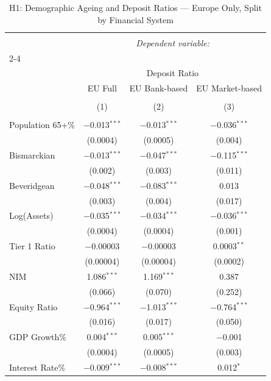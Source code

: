 
\begin{table}[!htbp] \centering 
  \caption{H1: Demographic Ageing and Deposit Ratios --- Europe Only, Split by Financial System} 
  \label{} 
\begin{tabular}{@{\extracolsep{5pt}}lccc} 
\\[-1.8ex]\hline 
\hline \\[-1.8ex] 
 & \multicolumn{3}{c}{\textit{Dependent variable:}} \\ 
\cline{2-4} 
\\[-1.8ex] & \multicolumn{3}{c}{Deposit Ratio} \\ 
 & EU Full & EU Bank-based & EU Market-based \\ 
\\[-1.8ex] & (1) & (2) & (3)\\ 
\hline \\[-1.8ex] 
 Population 65+\% & $-$0.013$^{***}$ & $-$0.013$^{***}$ & $-$0.036$^{***}$ \\ 
  & (0.0004) & (0.0005) & (0.004) \\ 
  Bismarckian & $-$0.013$^{***}$ & $-$0.047$^{***}$ & $-$0.115$^{***}$ \\ 
  & (0.002) & (0.003) & (0.011) \\ 
  Beveridgean & $-$0.048$^{***}$ & $-$0.083$^{***}$ & 0.013 \\ 
  & (0.003) & (0.004) & (0.017) \\ 
  Log(Assets) & $-$0.035$^{***}$ & $-$0.034$^{***}$ & $-$0.036$^{***}$ \\ 
  & (0.0004) & (0.0004) & (0.001) \\ 
  Tier 1 Ratio & $-$0.00003 & $-$0.00003 & 0.0003$^{**}$ \\ 
  & (0.00004) & (0.00004) & (0.0002) \\ 
  NIM & 1.086$^{***}$ & 1.169$^{***}$ & 0.387 \\ 
  & (0.066) & (0.070) & (0.252) \\ 
  Equity Ratio & $-$0.964$^{***}$ & $-$1.013$^{***}$ & $-$0.764$^{***}$ \\ 
  & (0.016) & (0.017) & (0.050) \\ 
  GDP Growth\% & 0.004$^{***}$ & 0.005$^{***}$ & $-$0.001 \\ 
  & (0.0004) & (0.0005) & (0.003) \\ 
  Interest Rate\% & $-$0.009$^{***}$ & $-$0.008$^{***}$ & 0.012$^{*}$ \\ 

\end{tabular}
\end{table}
